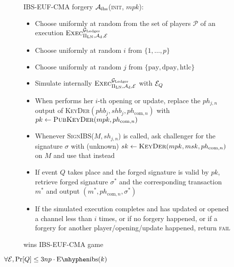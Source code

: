   \begin{figure}[!htbp]
    \begin{algobox}{\textsf{IBS-EUF-CMA} forgery}
      $\mathcal{A}_{\mathrm{ibs}}$(\textsc{init}, $mpk$):
      \begin{itemize}
        \item Choose uniformly at random \alice{} from the set of players
        $\mathcal{P}$ of an execution
        $\textsc{Exec}^{\mathcal{G}_{\mathrm{Ledger}}}_{\Pi_{\mathrm{LN}}, \mathcal{A}_{\mathrm{d}},
        \mathcal{E}}$
        \item Choose uniformly at random $i$ from $\{1, \dots, p\}$
        \item Choose uniformly at random $j$ from $\{\mathrm{pay},
        \mathrm{dpay}, \mathrm{htlc}\}$
        \item Simulate internally
        $\textsc{Exec}^{\mathcal{G}_{\mathrm{Ledger}}}_{\Pi_{\mathrm{LN}}, \mathcal{A}_{\mathrm{d}},
        \mathcal{E}}$ with $\mathcal{E}_Q$
        \item When \alice{} performs her $i$-th opening or update, replace the
        $ph_{j, n}$ output of \textsc{KeyDer}$(phb_j, shb_j, ph_{\mathrm{com},
        n})$ with $pk \gets \textsc{PubKeyDer}(mpk, ph_{\mathrm{com}, n})$
        \item Whenever \textsc{SignIBS}($M, sh_{j, n}$) is called, ask
        challenger for the signature $\sigma$ with (unknown) $sk \gets
        \textsc{KeyDer}(mpk, msk, ph_{\mathrm{com}, n})$ on $M$ and use that
        instead
        \item If event $Q$ takes place and the forged signature is valid by
        $pk$, retrieve forged signature $\sigma^*$ and the corresponding
        transaction $m^*$ and output $(m^*, ph_{\mathrm{com}, n},\sigma^*)$
        \item If the simulated execution completes and \alice{} has updated or
        opened a channel less than $i$ times, or if no forgery happened, or if a
        forgery for another player/opening/update happened, return \textsc{fail}
      \end{itemize}
    \end{algobox}
    \caption{wins \textsf{IBS-EUF-CMA} game}
    \label{alg:forge:ibs}
  \end{figure}

  \begin{proposition}
  \label{prop:forgery:ibs}
    $\forall \environment, \Pr[Q] \leq 3np \cdot \mathrm{E \mhyphen ibs}(k)$
  \end{proposition}

